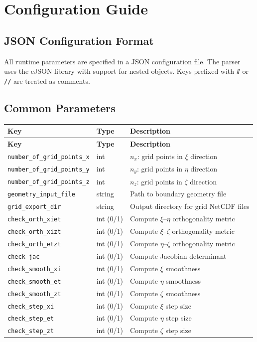 \documentclass[11pt,a4paper]{report}
\begin{document}
\chapter{Configuration Guide}

\section{JSON Configuration Format}

All runtime parameters are specified in a JSON configuration file. The parser uses the cJSON library with support for nested objects. Keys prefixed with \texttt{\#} or \texttt{//} are treated as comments.

\section{Common Parameters}

\begin{longtable}{llp{7cm}}
\toprule
\textbf{Key} & \textbf{Type} & \textbf{Description} \\
\midrule
\endfirsthead
\toprule
\textbf{Key} & \textbf{Type} & \textbf{Description} \\
\midrule
\endhead
\bottomrule
\endlastfoot
\texttt{number\_of\_grid\_points\_x} & int & $n_x$: grid points in $\xi$ direction \\
\texttt{number\_of\_grid\_points\_y} & int & $n_y$: grid points in $\eta$ direction \\
\texttt{number\_of\_grid\_points\_z} & int & $n_z$: grid points in $\zeta$ direction \\
\texttt{geometry\_input\_file} & string & Path to boundary geometry file \\
\texttt{grid\_export\_dir} & string & Output directory for grid NetCDF files \\
\texttt{check\_orth\_xiet} & int (0/1) & Compute $\xi$--$\eta$ orthogonality metric \\
\texttt{check\_orth\_xizt} & int (0/1) & Compute $\xi$--$\zeta$ orthogonality metric \\
\texttt{check\_orth\_etzt} & int (0/1) & Compute $\eta$--$\zeta$ orthogonality metric \\
\texttt{check\_jac} & int (0/1) & Compute Jacobian determinant \\
\texttt{check\_smooth\_xi} & int (0/1) & Compute $\xi$ smoothness \\
\texttt{check\_smooth\_et} & int (0/1) & Compute $\eta$ smoothness \\
\texttt{check\_smooth\_zt} & int (0/1) & Compute $\zeta$ smoothness \\
\texttt{check\_step\_xi} & int (0/1) & Compute $\xi$ step size \\
\texttt{check\_step\_et} & int (0/1) & Compute $\eta$ step size \\
\texttt{check\_step\_zt} & int (0/1) & Compute $\zeta$ step size \\
\end{longtable}
\end{document}
